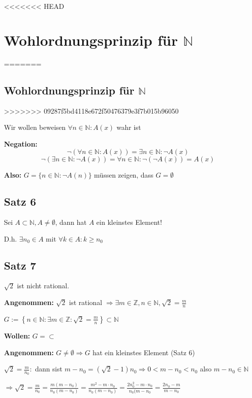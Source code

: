 \documentclass[fleqn]{scrbook}
\begin{document}
<<<<<<< HEAD
\section{Wohlordnungsprinzip für $\mathbb{N}$}
=======
\subsection{Wohlordnungsprinzip für \texorpdfstring{$\mathbb{N}$}{N}}
>>>>>>> 09287f5bd4118e672f50476379e3f7b015b96050

Wir wollen beweisen $\forall n \in \mathbb{N}: A(x)$ wahr ist

\textbf{Negation:}
\[\lnot(\forall n \in \mathbb{N}: A(x))=\exists n \in \mathbb{N}: \lnot A(x)\]
\[\lnot(\exists n \in \mathbb{N}: \lnot A(x))=\forall n \in \mathbb{N}: \lnot(\lnot A(x)) = A(x)\]

\textbf{Also:} $G=\{n\in \mathbb{N}: \lnot A(n)\}$ müssen zeigen, dass $G=\emptyset$

\subsection{Satz 6}

Sei $A \subset \mathbb{N}, A \neq \emptyset$, dann hat $A$ ein kleinstes Element!

D.h. $\exists n_0 \in A$ mit $\forall k \in A: k \geq n_0$

\subsection{Satz 7}

$\sqrt{2}$ ist nicht rational.

\textbf{Angenommen:} $\sqrt{2}$ ist rational $\Longrightarrow \exists m \in \mathbb{Z}, n \in \mathbb{N}, \sqrt{2}=\frac{m}{n}$

$G:=\left\{ n \in \mathbb{N}: \exists m \in \mathbb{Z}: \sqrt{2} = \frac{m}{n} \right\} \subset \mathbb{N}$

\textbf{Wollen:} $G=\subset$

\textbf{Angenommen:} $G \neq \emptyset \Longrightarrow G$ hat ein kleinstes Element (Satz 6)

$\sqrt{2}=\frac{m}{n_0}:$ dann sist $m-n_0 = (\sqrt{2}-1)n_0 \Longrightarrow 0<m-n_0<n_0$ also $m-n_0 \in \mathbb{N}$

$\Longrightarrow \sqrt{2} = \frac{m}{n_0} = \frac{m(m-n_0)}{n_0(m-n_0)} = \frac{m^2-m \cdot n_0}{n_0(m-n_0)} = \frac{2n_0^2-m \cdot n_0}{n_0(m-n_0} = \frac{2n_0-m}{m-n_0}$
\end{document}
